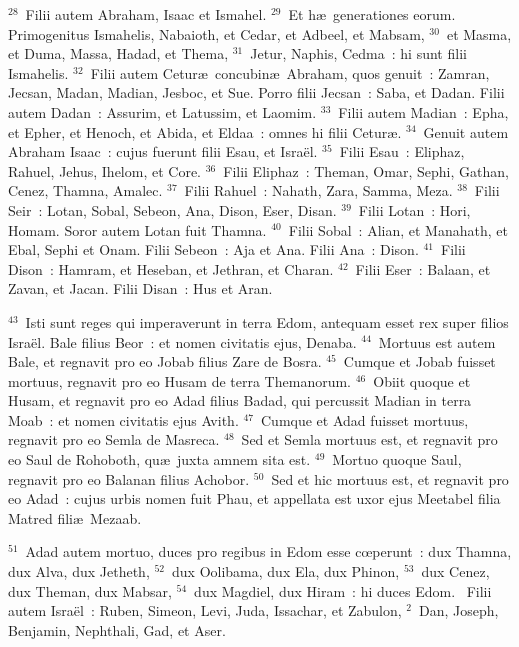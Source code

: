 ${}^{28}$~Filii autem Abraham, Isaac et Ismahel.
${}^{29}$~Et h\ae\ generationes eorum. Primogenitus Ismahelis, Nabaioth, et Cedar, et Adbeel, et Mabsam,
${}^{30}$~et Masma, et Duma, Massa, Hadad, et Thema,
${}^{31}$~Jetur, Naphis, Cedma~: hi sunt filii Ismahelis.
${}^{32}$~Filii autem Cetur\ae\ concubin\ae\ Abraham, quos genuit~: Zamran, Jecsan, Madan, Madian, Jesboc, et Sue. Porro filii Jecsan~: Saba, et Dadan. Filii autem Dadan~: Assurim, et Latussim, et Laomim.
${}^{33}$~Filii autem Madian~: Epha, et Epher, et Henoch, et Abida, et Eldaa~: omnes hi filii Cetur\ae .
${}^{34}$~Genuit autem Abraham Isaac~: cujus fuerunt filii Esau, et Isra\"el.
${}^{35}$~Filii Esau~: Eliphaz, Rahuel, Jehus, Ihelom, et Core.
${}^{36}$~Filii Eliphaz~: Theman, Omar, Sephi, Gathan, Cenez, Thamna, Amalec.
${}^{37}$~Filii Rahuel~: Nahath, Zara, Samma, Meza.
${}^{38}$~Filii Seir~: Lotan, Sobal, Sebeon, Ana, Dison, Eser, Disan.
${}^{39}$~Filii Lotan~: Hori, Homam. Soror autem Lotan fuit Thamna.
${}^{40}$~Filii Sobal~: Alian, et Manahath, et Ebal, Sephi et Onam. Filii Sebeon~: Aja et Ana. Filii Ana~: Dison.
${}^{41}$~Filii Dison~: Hamram, et Heseban, et Jethran, et Charan.
${}^{42}$~Filii Eser~: Balaan, et Zavan, et Jacan. Filii Disan~: Hus et Aran.


${}^{43}$~Isti sunt reges qui imperaverunt in terra Edom, antequam esset rex super filios Isra\"el. Bale filius Beor~: et nomen civitatis ejus, Denaba.
${}^{44}$~Mortuus est autem Bale, et regnavit pro eo Jobab filius Zare de Bosra.
${}^{45}$~Cumque et Jobab fuisset mortuus, regnavit pro eo Husam de terra Themanorum.
${}^{46}$~Obiit quoque et Husam, et regnavit pro eo Adad filius Badad, qui percussit Madian in terra Moab~: et nomen civitatis ejus Avith.
${}^{47}$~Cumque et Adad fuisset mortuus, regnavit pro eo Semla de Masreca.
${}^{48}$~Sed et Semla mortuus est, et regnavit pro eo Saul de Rohoboth, qu\ae\ juxta amnem sita est.
${}^{49}$~Mortuo quoque Saul, regnavit pro eo Balanan filius Achobor.
${}^{50}$~Sed et hic mortuus est, et regnavit pro eo Adad~: cujus urbis nomen fuit Phau, et appellata est uxor ejus Meetabel filia Matred fili\ae\ Mezaab.


${}^{51}$~Adad autem mortuo, duces pro regibus in Edom esse cœperunt~: dux Thamna, dux Alva, dux Jetheth,
${}^{52}$~dux Oolibama, dux Ela, dux Phinon,
${}^{53}$~dux Cenez, dux Theman, dux Mabsar,
${}^{54}$~dux Magdiel, dux Hiram~: hi duces Edom.
~Filii autem Isra\"el~: Ruben, Simeon, Levi, Juda, Issachar, et Zabulon,
${}^{2}$~Dan, Joseph, Benjamin, Nephthali, Gad, et Aser.


